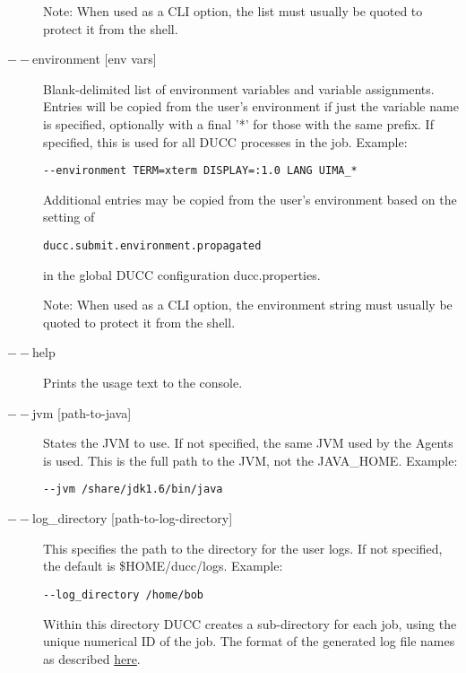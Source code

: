 \begin{description}
             Note: When used as a CLI option, the list must usually be
             quoted to protect it from the shell.

           \item[$--$environment {[env vars]}] Blank-delimited list of environment variables and
             variable assignments. 
             Entries will be copied from the user's environment if just the variable name is
             specified, optionally with a final '*' for those with the same prefix.
             If specified, this is used for all DUCC processes in the job. Example:
\begin{verbatim}
--environment TERM=xterm DISPLAY=:1.0 LANG UIMA_*
\end{verbatim}
             
             Additional entries may be copied from the user's environment based on the setting of
\begin{verbatim}
ducc.submit.environment.propagated
\end{verbatim}
             in the global DUCC configuration ducc.properties.

             Note: When used as a CLI option, the environment string must usually be
             quoted to protect it from the shell.

           \item[$--$help ]

             Prints the usage text to the console. 

           \item[$--$jvm {[path-to-java]}  ]

             States the JVM to use. If not specified, the same JVM used by the Agents is used.  This is
             the full path to the JVM, not the JAVA\_HOME.
             Example: 
\begin{verbatim}
--jvm /share/jdk1.6/bin/java 
\end{verbatim}
             
           \item[$--$log\_directory {[path-to-log-directory]} ]

             This specifies the path to the directory for the user logs. If not specified, the default is
             \$HOME/ducc/logs. Example: 
             \begin{verbatim}
--log_directory /home/bob 
             \end{verbatim}
             
             Within this directory DUCC creates a sub-directory for each job, using the unique numerical 
             ID of the job. The format of the generated log file names as described
             \hyperref[chap:job-logs]{here}.
             

\end{description}
